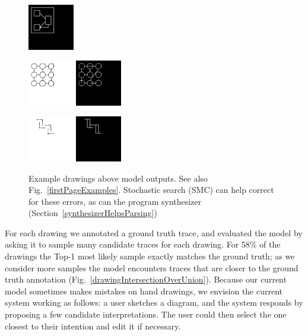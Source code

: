\documentclass{article}
\newcommand{\remark}[1]{\textcolor{red}{[#1]}}
\begin{document}
\begin{figure}[H]
\begin{minipage}[t]{2.25cm}
    \includegraphics[width = 2cm]{figures/0-parse.png}    
  \end{minipage}
  \begin{minipage}[t]{2.25cm}
    \includegraphics[width = 2cm]{figures/expert-38.png}
    \includegraphics[width = 2cm]{figures/38-parse.png}    
  \end{minipage}
  \begin{minipage}[t]{2.25cm}
    \includegraphics[width = 2cm]{figures/expert-34.png}
    \includegraphics[width = 2cm]{figures/34-parse.png}     
    \end{minipage}
  \caption{Example drawings above model outputs. See also Fig.~\ref{firstPageExamples}. Stochastic search (SMC) can help correct for these errors, as can the program synthesizer (Section~\ref{synthesizerHelpsParsing})}\label{lotsOfHandDrawings}%
\end{figure}
For each drawing we annotated a ground truth trace, and evaluated the
model by asking it to sample many candidate traces for each drawing.
For 58\% of the drawings the Top-1 most likely sample exactly matches the
ground truth; as we consider more samples the model encounters traces
that are closer to the ground truth annotation (Fig.~\ref{drawingIntersectionOverUnion}).
Because our current model sometimes makes mistakes on hand drawings,
we envision the current system working as follows:
a user sketches a diagram,
and the system responds by proposing a few candidate interpretations.
The user could then select the one closest to their intention and edit it if necessary.
\end{document}
